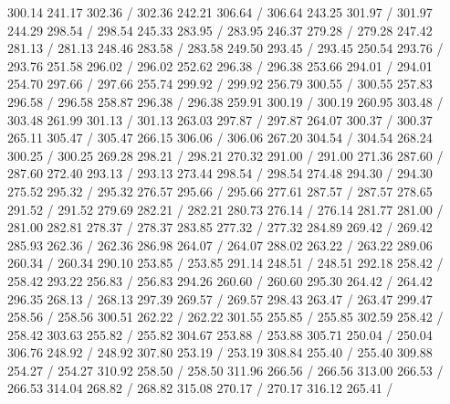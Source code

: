 { 300.14 241.17 302.36 /
 302.36 242.21 306.64 /
 306.64 243.25 301.97 /
 301.97 244.29 298.54 /
 298.54 245.33 283.95 /
 283.95 246.37 279.28 /
 279.28 247.42 281.13 /
 281.13 248.46 283.58 /
 283.58 249.50 293.45 /
 293.45 250.54 293.76 /
 293.76 251.58 296.02 /
 296.02 252.62 296.38 /
 296.38 253.66 294.01 /
 294.01 254.70 297.66 /
 297.66 255.74 299.92 /
 299.92 256.79 300.55 /
 300.55 257.83 296.58 /
 296.58 258.87 296.38 /
 296.38 259.91 300.19 /
 300.19 260.95 303.48 /
 303.48 261.99 301.13 /
 301.13 263.03 297.87 /
 297.87 264.07 300.37 /
 300.37 265.11 305.47 /
 305.47 266.15 306.06 /
 306.06 267.20 304.54 /
 304.54 268.24 300.25 /
 300.25 269.28 298.21 /
 298.21 270.32 291.00 /
 291.00 271.36 287.60 /
 287.60 272.40 293.13 /
 293.13 273.44 298.54 /
 298.54 274.48 294.30 /
 294.30 275.52 295.32 /
 295.32 276.57 295.66 /
 295.66 277.61 287.57 /
 287.57 278.65 291.52 /
 291.52 279.69 282.21 /
 282.21 280.73 276.14 /
 276.14 281.77 281.00 /
 281.00 282.81 278.37 /
 278.37 283.85 277.32 /
 277.32 284.89 269.42 /
 269.42 285.93 262.36 /
 262.36 286.98 264.07 /
 264.07 288.02 263.22 /
 263.22 289.06 260.34 /
 260.34 290.10 253.85 /
 253.85 291.14 248.51 /
 248.51 292.18 258.42 /
 258.42 293.22 256.83 /
 256.83 294.26 260.60 /
 260.60 295.30 264.42 /
 264.42 296.35 268.13 /
 268.13 297.39 269.57 /
 269.57 298.43 263.47 /
 263.47 299.47 258.56 /
 258.56 300.51 262.22 /
 262.22 301.55 255.85 /
 255.85 302.59 258.42 /
 258.42 303.63 255.82 /
 255.82 304.67 253.88 /
 253.88 305.71 250.04 /
 250.04 306.76 248.92 /
 248.92 307.80 253.19 /
 253.19 308.84 255.40 /
 255.40 309.88 254.27 /
 254.27 310.92 258.50 /
 258.50 311.96 266.56 /
 266.56 313.00 266.53 /
 266.53 314.04 268.82 /
 268.82 315.08 270.17 /
 270.17 316.12 265.41 /
}
